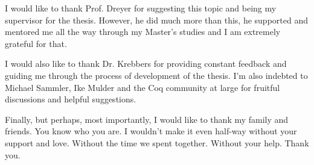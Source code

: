 I would like to thank Prof. Dreyer for suggesting this topic and being my supervisor for the thesis.
However, he did much more than this, he supported and mentored me all the way through my Master's studies and I am extremely grateful for that.

I would also like to thank Dr. Krebbers for providing constant feedback and guiding me through the process of development of the thesis.
I'm also indebted to Michael Sammler, Ike Mulder and the Coq community at large for fruitful discussions and helpful suggestions.

Finally, but perhaps, most importantly, I would like to thank my family and friends.
You know who you are.
I wouldn't make it even half-way without your support and love.
Without the time we spent together.
Without your help.
Thank you.



